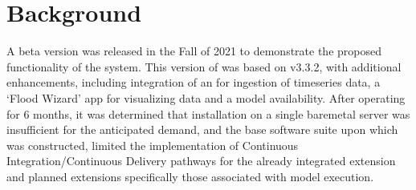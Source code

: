 \documentclass[letterpaper,12pt,english,openany,oneside]{sphinxmanual}
\begin{document}
\section{Background}
\label{\detokenize{euidev/background/index:background}}\label{\detokenize{euidev/background/index::doc}}
\sphinxAtStartPar
A beta version {\hyperref[\detokenize{_static/glossary:term-RGVFlood.com}]{}} was released in the Fall of 2021 to demonstrate the proposed functionality of the system. This version of {\hyperref[\detokenize{_static/glossary:term-RGVFlood.com}]{}} was based on {\hyperref[\detokenize{_static/glossary:term-0}]{}} v3.3.2, with additional enhancements, including integration of an {\hyperref[\detokenize{_static/glossary:term-API}]{}} for ingestion of timeseries {\hyperref[\detokenize{_static/glossary:term-RTHS}]{}} data, a ‘Flood Wizard’ app for visualizing data and a {\hyperref[\detokenize{_static/glossary:term-H-H}]{}} model availability. After operating for 6 months, it was determined that installation on a single bare\sphinxhyphen{}metal server was insufficient for the anticipated  demand, and the base software suite upon which {\hyperref[\detokenize{_static/glossary:term-RGVFlood.com}]{}} was constructed, limited the implementation of Continuous Integration/Continuous Delivery pathways for the already integrated extension and planned extensions \sphinxhyphen{} specifically those associated with {\hyperref[\detokenize{_static/glossary:term-H-H}]{}} model execution.
\end{document}
